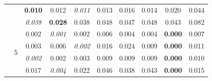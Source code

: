 \documentclass[authoryear, review, 11pt]{elsarticle}
\begin{document}
\begin{table}
\begin{center}
{\begin{tabular}{cccccccccc}
		  &  & \textbf{0.010} & 0.012 & \emph{0.011} & 0.013 & 0.016 & 0.014 & 0.020 & 0.044 \\ 
		  &  & \emph{0.038} & \textbf{0.028} & 0.038 & 0.048 & 0.047 & 0.048 & 0.043 & 0.082 \\ 
		  \cline{3-10}
		  & \multirow{4}{*}{5} & 0.002 & \emph{0.001} & 0.002 & 0.006 & 0.004 & 0.004 & \textbf{0.000} & 0.007 \\ 
		  &  & 0.003 & 0.006 & \emph{0.002} & 0.016 & 0.024 & 0.009 & \textbf{0.000} & 0.011 \\ 
		  &  & \emph{0.002} & 0.002 & 0.003 & 0.009 & 0.009 & 0.009 & \textbf{0.000} & 0.010 \\ 
		  &  & 0.017 & \emph{0.004} & 0.022 & 0.046 & 0.038 & 0.043 & \textbf{0.000} & 0.015 \\ 
		  

\end{tabular}}
\end{center}
\end{table}
\end{document}
